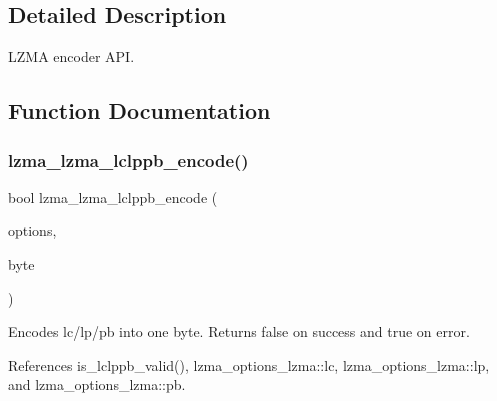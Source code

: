 \subsection{Detailed Description}
L\+Z\+MA encoder A\+PI. 



\subsection{Function Documentation}
\mbox{\label{lzma__encoder_8h_a24e42d27f537c4382fe298c9909b1a52}} 
\subsubsection{lzma\+\_\+lzma\+\_\+lclppb\+\_\+encode()}
{\footnotesize\ttfamily bool lzma\+\_\+lzma\+\_\+lclppb\+\_\+encode (\begin{DoxyParamCaption}\item[{const \textbf{ lzma\+\_\+options\+\_\+lzma} $\ast$}]{options,  }\item[{uint8\+\_\+t $\ast$}]{byte }\end{DoxyParamCaption})}



Encodes lc/lp/pb into one byte. Returns false on success and true on error. 



References is\+\_\+lclppb\+\_\+valid(), lzma\+\_\+options\+\_\+lzma\+::lc, lzma\+\_\+options\+\_\+lzma\+::lp, and lzma\+\_\+options\+\_\+lzma\+::pb.

